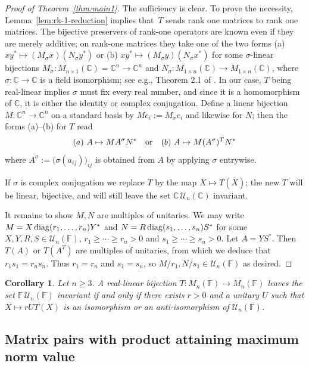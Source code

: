 \documentclass[11pt]{article}
\newtheorem{corollary}[theorem]{Corollary}
\numberwithin{equation}{section}
\def\IF{{\mathbb F}}
\def\IC{{\mathbb C}}
\def\diag{{\rm diag}}
\begin{document}
\begin{proof}[Proof of Theorem~\ref{thm:main1}]
The sufficiency is clear. To prove the necessity, Lemma~\ref{lem:rk-1-reduction} implies that~$T$ sends rank one matrices to rank one matrices.
The bijective preservers of rank-one  operators are known even if they are merely additive; on rank-one matrices they take one of the two forms
  (a) $xy^\ast\mapsto (M_\sigma x) (N_\sigma y^\ast)$ or (b) $xy^\ast\mapsto(M_\sigma y)(N_\sigma x^\ast)$  for some $\sigma$-linear bijections $M_{\sigma}\colon M_{n\times 1}(\IC)=\IC^n\to\IC^n$ and $N_{\sigma}:M_{1\times n}(\IC)\to M_{1\times n}(\IC)$, where $\sigma\colon\IC\to\IC$ is a field isomorphism; see e.g., Theorem 2.1 of \cite{Kuzma2002}. In our case, $T$ being real-linear implies $\sigma$ must fix every real number, and since it is a homomorphism of $\IC$, it is either the identity or complex conjugation. Define a linear bijection $M\colon\IC^n\to\IC^n$ on a standard basis by $Me_i:=M_{\sigma} e_i$ and likewise for $N$; then the forms (a)--(b) for $T$ read
    $$(a)\ A \mapsto MA^\sigma N^\ast\quad\hbox{or}\quad (b)\ A\mapsto M(A^\sigma)^T N^\ast$$ where $A^\sigma:=\bigl(\sigma(a_{ij})\bigr)_{ij}$ is obtained from $A$ by applying  $\sigma$ entrywise.

If $\sigma$ is complex conjugation  we replace $T$ by the map $X\mapsto T(\overline{X})$; the new $T$ will be linear, bijective, and will still leave the set $\IC\, {\mathcal U}_n(\IC)$ invariant.

It remains to show  $M,N$ are multiples of unitaries.  We may write
$M = X\, \diag(r_1, \dots, r_n)Y^*$ and $N = R\, \diag(s_1, \dots, s_n) S^*$ for some
$X, Y, R, S \in {\mathcal U}_n(\IF)$, $r_1 \ge \cdots \ge r_n > 0$ and
$s_1 \ge \cdots \ge s_n > 0$. Let $A = Y S^*$. Then $T(A)$ or $T(A^T)$ are multiples of unitaries, from which we deduce that $r_1s_1=r_ns_n$.  Thus $r_1 = r_n$ and $s_1= s_n$, so $M/r_1, N/s_1 \in {\mathcal U}_n(\IF)$ as desired.
\end{proof}

\begin{corollary}
 Let $n\ge 3$. A real-linear bijection $T\colon M_n(\IF)\to M_n(\IF)$ leaves the set $\IF\,{\mathcal U}_n(\IF)$ invariant if and only if there exists $r>0$  and a unitary $U$ such that $X\mapsto rUT(X)$ is an isomorphism or an anti-isomorphism of ${\mathcal U}_n(\IF)$.
\end{corollary}
\subsection{Matrix pairs with product attaining maximum norm value}
\end{document}
